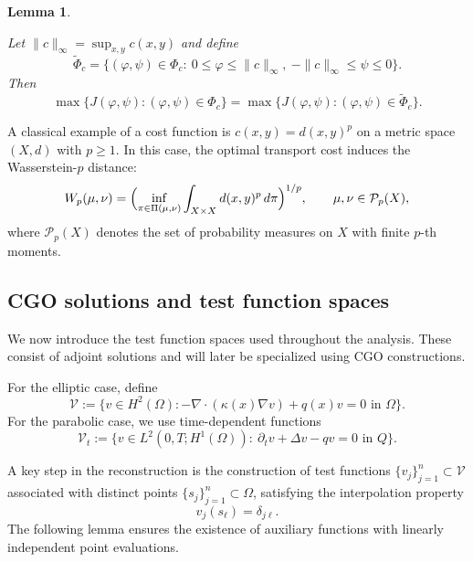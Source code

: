 \documentclass[12pt]{amsart}
\newtheorem{lem}[thm]{Lemma}
\begin{document}
\begin{lem}\label{restrict lem}

    Let $\|c\|_\infty=\sup_{x,y}c(x,y)$ and define
    \[
    \widetilde{\Phi}_c=\{(\varphi,\psi)\in\Phi_c:\ 0\le \varphi\le \|c\|_\infty,\ -\|c\|_\infty\le \psi\le 0\}.
    \]
    Then
    \[
    \max\{J(\varphi,\psi):(\varphi,\psi)\in\Phi_c\}
    =\max\{J(\varphi,\psi):(\varphi,\psi)\in\widetilde{\Phi}_c\}.
    \]
\end{lem}

A classical example of a cost function is $c(x,y)=d(x,y)^p$ on a metric space $(X,d)$ with $p\ge1$. In this case, the optimal transport cost induces the  Wasserstein-$p$ distance:
\[
W_p(\mu,\nu)=\Bigl(\inf_{\pi\in\Pi(\mu,\nu)}\int_{X\times X}d(x,y)^p\,d\pi\Bigr)^{1/p},
\qquad \mu,\nu\in\mathcal{P}_p(X),
\]
where $\mathcal{P}_p(X)$ denotes the set of probability measures on $X$ with finite $p$-th moments.


\subsection{CGO solutions and test function spaces}

We now introduce the test function spaces used throughout the analysis. These consist of adjoint solutions and will later be specialized using CGO constructions.

For the elliptic case, define
\[
\mathcal{V}:=\{v\in H^2(\Omega): -\nabla\cdot(\kappa(x)\nabla v)+q(x)v=0 \text{ in }\Omega\}.
\]
For the parabolic case, we use time-dependent functions
\[
\mathcal{V}_t:=\{v\in L^2(0,T;H^1(\Omega)):\ \partial_t v+\Delta v-qv=0\text{ in }Q\}.
\]

A key step in the reconstruction is the construction of test functions $\{v_j\}_{j=1}^n\subset \mathcal{V}$ associated with distinct points $\{s_j\}_{j=1}^n\subset\Omega$, satisfying the interpolation property
\[
v_j(s_\ell)=\delta_{j\ell}.
\]
The following lemma ensures the existence of auxiliary functions with linearly independent point evaluations.
\end{document}
